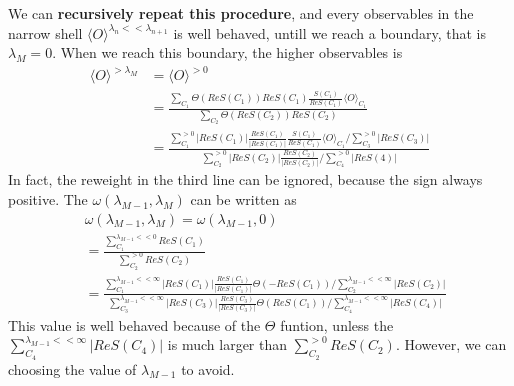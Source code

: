 \documentclass{article}
\begin{document}
    
    We can \textbf{recursively repeat this procedure}, and every observables in the narrow shell $\langle O \rangle^{\lambda_{n}<<\lambda_{n+1}}$ is well
    behaved, untill we reach a boundary, that is $\lambda_{M} = 0$. When we reach this boundary, the higher observables is
    \begin{equation}
        \begin{aligned}
            \langle O \rangle^{>\lambda_{M}} &= \langle O \rangle^{>0} \\
            &=\frac{\sum_{C_{1}} \Theta(ReS(C_{1})) ReS(C_{1}) \frac{S(C_{1})}{ReS(C_{1})} \langle O \rangle_{C_{1}}}{\sum_{C_{2}} \Theta(ReS(C_{2})) ReS(C_{2})}\\
            &=\frac{\sum^{>0}_{C_{1}} \vert ReS(C_{1}) \vert \frac{ReS(C_{1})}{\vert ReS(C_{1}) \vert}  \frac{S(C_{1})}{ReS(C_{1})} \langle O \rangle_{C_{1}} / \sum^{>0}_{C_{3}} \vert ReS(C_{3}) \vert}
            {\sum^{>0}_{C_{2}} \vert ReS(C_{2}) \vert \frac{ReS(C_{2})}{\vert ReS(C_{2}) \vert} / \sum^{>0}_{C_{4}} \vert ReS(4) \vert}
        \end{aligned}
    \end{equation}
    In fact, the reweight in the third line can be ignored, because the sign always positive.
    The $\omega(\lambda_{M-1}, \lambda_{M})$ can be written as
    \begin{equation}
        \begin{aligned}
            &\omega(\lambda_{M-1}, \lambda_{M}) = \omega(\lambda_{M-1}, 0)\\
            &= \frac{\sum^{\lambda_{M-1}<<0}_{C_{1}} ReS(C_{1})}
            {\sum^{>0}_{C_{2}} ReS(C_{2})} \\
            &= \frac{\sum^{\lambda_{M-1}<<\infty}_{C_{1}} \vert ReS(C_{1}) \vert \frac{ReS(C_{1})}{\vert ReS(C_{1})\vert } \Theta(-ReS(C_{1}))  / \sum^{\lambda_{M-1}<<\infty}_{C_{2}} \vert ReS(C_{2}) \vert}
            {\sum^{\lambda_{M-1}<<\infty}_{C_{3}} \vert ReS(C_{3}) \vert \frac{ReS(C_{3})}{\vert ReS(C_{3})\vert } \Theta(ReS(C_{1}))  / \sum^{\lambda_{M-1}<<\infty}_{C_{4}} \vert ReS(C_{4}) \vert}
        \end{aligned}
    \end{equation}
    This value is well behaved because of the $\Theta$ funtion, unless the 
    $\sum^{\lambda_{M-1}<<\infty}_{C_{4}} \vert ReS(C_{4}) \vert$ is much larger than $\sum^{>0}_{C_{2}} ReS(C_{2})$.
    However, we can choosing the value of $\lambda_{M-1}$ to avoid.
\end{document}
